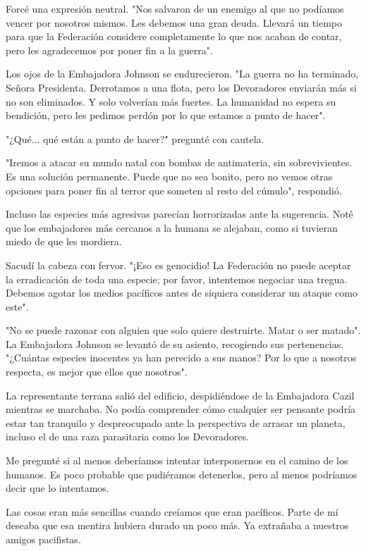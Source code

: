 \documentclass[spanish,12pt,a4paper,oneside,titlepage]{book}
\begin{document}
    Forcé una expresión neutral. "Nos salvaron de un enemigo al que no podíamos vencer por nosotros mismos. Les debemos una gran deuda. Llevará un tiempo para que la Federación considere completamente lo que nos acaban de contar, pero les agradecemos por poner fin a la guerra".

    Los ojos de la Embajadora Johnson se endurecieron. "La guerra no ha terminado, Señora Presidenta. Derrotamos a una flota, pero los Devoradores enviarán más si no son eliminados. Y solo volverían más fuertes. La humanidad no espera su bendición, pero les pedimos perdón por lo que estamos a punto de hacer".

    "¿Qué... qué están a punto de hacer?" pregunté con cautela.

    "Iremos a atacar su mundo natal con bombas de antimateria, sin sobrevivientes. Es una solución permanente. Puede que no sea bonito, pero no vemos otras opciones para poner fin al terror que someten al resto del cúmulo", respondió.

    Incluso las especies más agresivas parecían horrorizadas ante la sugerencia. Noté que los embajadores más cercanos a la humana se alejaban, como si tuvieran miedo de que les mordiera.

    Sacudí la cabeza con fervor. "¡Eso es genocidio! La Federación no puede aceptar la erradicación de toda una especie; por favor, intentemos negociar una tregua. Debemos agotar los medios pacíficos antes de siquiera considerar un ataque como este".

    "No se puede razonar con alguien que solo quiere destruirte. Matar o ser matado". La Embajadora Johnson se levantó de su asiento, recogiendo sus pertenencias. "¿Cuántas especies inocentes ya han perecido a sus manos? Por lo que a nosotros respecta, es mejor que ellos que nosotros".

    La representante terrana salió del edificio, despidiéndose de la Embajadora Cazil mientras se marchaba. No podía comprender cómo cualquier ser pensante podría estar tan tranquilo y despreocupado ante la perspectiva de arrasar un planeta, incluso el de una raza parasitaria como los Devoradores.

    Me pregunté si al menos deberíamos intentar interponernos en el camino de los humanos. Es poco probable que pudiéramos detenerlos, pero al menos podríamos decir que lo intentamos.

    Las cosas eran más sencillas cuando creíamos que eran pacíficos. Parte de mí deseaba que esa mentira hubiera durado un poco más. Ya extrañaba a nuestros amigos pacifistas.
\end{document}
